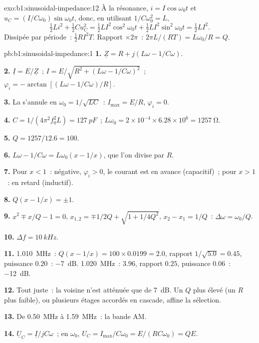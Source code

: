 \begin{solution}{exo:b1:sinusoidal-impedance:12}
À la résonance, $i = I\cos\omega_0 t$ et $u_C = (I/C\omega_0)\sin\omega_0 t$,
donc, en utilisant $1/C\omega_0^2 = L$,
\[
\tfrac12 Li^2 + \tfrac12 Cu_C^2 = \tfrac12 LI^2\cos^2\omega_0 t
+ \tfrac12 LI^2\sin^2\omega_0 t = \tfrac12 LI^2 .
\]
Dissipée par période~: $\tfrac12 RI^2T$. Rapport $\times 2\pi$~: $2\pi L/(RT)
= L\omega_0/R = Q$.
\end{solution}

\begin{solution}{pb:b1:sinusoidal-impedance:1}
\textbf{1.} $\underline Z = R + j(L\omega - 1/C\omega)$.

\textbf{2.} $\underline I = E/\underline Z$~; $I = E/\sqrt{R^2 + (L\omega -
1/C\omega)^2}$~; $\varphi_i = -\arctan[(L\omega - 1/C\omega)/R]$.

\textbf{3.} La  s'annule en $\omega_0 = 1/\sqrt{LC}$~: $I_{\max}
= E/R$, $\varphi_i = 0$.

\textbf{4.} $C = 1/(4\pi^2f_0^2L) = \qty{127}{pF}$~; $L\omega_0 = 2\times10^{-4}
\times 6.28\times10^6 = \qty{1257}{\ohm}$.

\textbf{5.} $Q = 1257/12.6 = 100$.

\textbf{6.} $L\omega - 1/C\omega = L\omega_0(x - 1/x)$, que l'on divise par $R$.

\textbf{7.} Pour $x < 1$~:  négative, $\varphi_i > 0$, le
courant est en avance (capacitif)~; pour $x > 1$~: en retard (inductif).

\textbf{8.} $Q(x - 1/x) = \pm1$.

\textbf{9.} $x^2 \mp x/Q - 1 = 0$, $x_{1,2} = \mp1/2Q + \sqrt{1 + 1/4Q^2}$,
$x_2 - x_1 = 1/Q$~: $\Delta\omega = \omega_0/Q$.

\textbf{10.} $\Delta f = \qty{10}{kHz}$.

\textbf{11.} \qty{1.010}{MHz}~: $Q(x - 1/x) = 100 \times 0.0199 = 2.0$,
rapport $1/\sqrt{5.0} = 0.45$, puissance $0.20$~: \qty{-7}{dB}. \qty{1.020}{MHz}~:
$3.96$, rapport $0.25$, puissance $0.06$~: \qty{-12}{dB}.

\textbf{12.} Tout juste~: la voisine n'est atténuée que de \qty{7}{dB}.
Un $Q$ plus élevé (un $R$ plus faible), ou plusieurs étages accordés en
cascade, affine la sélection.

\textbf{13.} De \qty{0.50}{MHz} à \qty{1.59}{MHz}~: la bande AM.

\textbf{14.} $\underline U_C = \underline I/jC\omega$~; en $\omega_0$,
$U_C = I_{\max}/C\omega_0 = E/(RC\omega_0) = QE$.


\end{solution}
